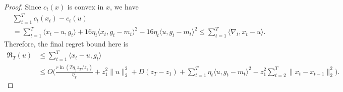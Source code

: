 \documentclass{article}
\theoremstyle{plain}
\theoremstyle{definition}
\theoremstyle{remark}
\newcommand{\regret}{\mathfrak{R}}
\begin{document}
\begin{proof}
Since $c_t(x)$ is convex in $x$, we have
\begin{align*}
&\sum_{t=1}^T c_t(x_t)-c_t(u)\\
&=\sum_{t=1}^T \langle x_t-u,g_t\rangle+16\eta_t\langle x_t,g_t-m_t\rangle^2-16\eta_t\langle u,g_t-m_t\rangle^2\leq \sum_{t=1}^T \langle \nabla_t,x_t-u\rangle.
\end{align*}
Therefore, the final regret bound here is
\begin{align*}
\regret_T(u)&\leq\sum_{t=1}^T\langle x_t-u,g_t\rangle\\
&\leq O\Big(\frac{r\ln(T\eta_1 z_T/z_1)}{\eta_T}+z_1^2\|u\|_2^2+D(z_T-z_1)+\sum_{t=1}^T\eta_t\langle u,g_t-m_t\rangle^2-z_1^2\sum_{t=2}^T\|x_t-x_{t-1}\|_2^2\Big).
\end{align*}

\end{proof}
\end{document}
